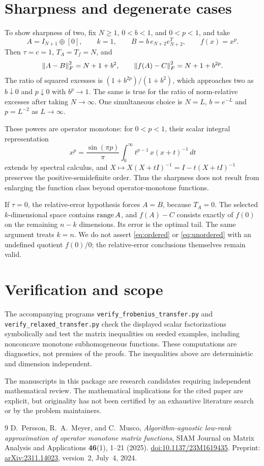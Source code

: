 \documentclass[11pt]{article}
\newcommand{\TA}{T_A}
\newcommand{\Tf}{T_f}
\begin{document}
\section{Sharpness and degenerate cases}
To show sharpness of two, fix $N\ge1$, $0<b<1$, and $0<p<1$, and take
\[
 A=I_{N+1}\oplus[0],\qquad k=1,\qquad
 B=b\,e_{N+2}e_{N+2}^T,\qquad f(x)=x^p.
\]
Then $\tau=c=1$, $\TA=\Tf=N$, and
\[
 \left\lVert A-B\right\rVert_F^2=N+1+b^2,\qquad
 \left\lVert f(A)-C\right\rVert_F^2=N+1+b^{2p}.
\]
The ratio of squared excesses is $(1+b^{2p})/(1+b^2)$, which approaches two as $b\downarrow0$ and $p\downarrow0$ with $b^p\to1$. The same is true for the ratio of norm-relative excesses after taking $N\to\infty$. One simultaneous choice is $N=L$, $b=e^{-L}$ and $p=L^{-2}$ as $L\to\infty$.

These powers are operator monotone: for $0<p<1$, their scalar integral representation
\[
 x^p=\frac{\sin(\pi p)}\pi
       \int_0^\infty t^{p-1}\,x(x+t)^{-1}\,dt
\]
extends by spectral calculus, and $X\mapsto X(X+tI)^{-1}=I-t(X+tI)^{-1}$ preserves the positive-semidefinite order. Thus the sharpness does not result from enlarging the function class beyond operator-monotone functions.

If $\tau=0$, the relative-error hypothesis forces $A=B$, because $\TA=0$. The selected $k$-dimensional space contains $\operatorname{range} A$, and $f(A)-C$ consists exactly of $f(0)$ on the remaining $n-k$ dimensions. Its error is the optimal tail. The same argument treats $k=n$. We do not assert \eqref{eq:ordered} or \eqref{eq:unordered} with an undefined quotient $f(0)/0$; the relative-error conclusions themselves remain valid.

\section{Verification and scope}
The accompanying programs \texttt{verify\_frobenius\_transfer.py} and \texttt{verify\_relaxed\_transfer.py} check the displayed scalar factorizations symbolically and test the matrix inequalities on seeded examples, including nonconcave monotone subhomogeneous functions. These computations are diagnostics, not premises of the proofs. The inequalities above are deterministic and dimension independent.

The manuscripts in this package are research candidates requiring independent mathematical review. The mathematical implications for the cited paper are explicit, but originality has not been certified by an exhaustive literature search or by the problem maintainers.

\begin{thebibliography}{9}
D.~Persson, R.~A.~Meyer, and C.~Musco,
\emph{Algorithm-agnostic low-rank approximation of operator monotone matrix functions},
SIAM Journal on Matrix Analysis and Applications \textbf{46}(1), 1--21 (2025).
\href{https://doi.org/10.1137/23M1619435}{doi:10.1137/23M1619435}.
Preprint: \href{https://arxiv.org/abs/2311.14023}{arXiv:2311.14023}, version~2, July~4, 2024.
\end{thebibliography}
\end{document}
